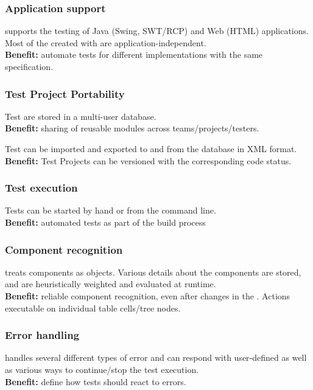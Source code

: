 
\subsubsection{Application support}
\jb{} supports the testing of Java (Swing, SWT/RCP) and Web (HTML) applications. Most of the \gdcases{} created with \jb{}  are application-independent. \\
\textbf{Benefit:} automate tests for different \gdaut{} implementations with the same specification.


\subsubsection{Test Project Portability}
Test \gdprojects{} are stored in a multi-user database.\\
\textbf{Benefit:} sharing of reusable modules across teams/projects/testers.
 
Test \gdprojects{} can be imported and exported to and from the database in XML format.\\
\textbf{Benefit:} Test Projects can be versioned with the corresponding code status. 

\subsubsection{Test execution}
Tests can be started by hand or from the command line. \\
 \textbf{Benefit:} automated tests as part of the build process

\subsubsection{Component recognition}
\jb{} treats components as objects. Various details about the components are stored, and are heuristically weighted and evaluated at runtime. \\

\textbf{Benefit:} reliable component recognition, even after changes in the \gdaut{}. Actions executable on individual table cells/tree nodes. 

\subsubsection{Error handling}
\jb{} handles several different types of error and can respond with user-defined \gdsteps{} as well as various ways to continue/stop the test execution. \\
\textbf{Benefit:} define how tests should react to errors. 


